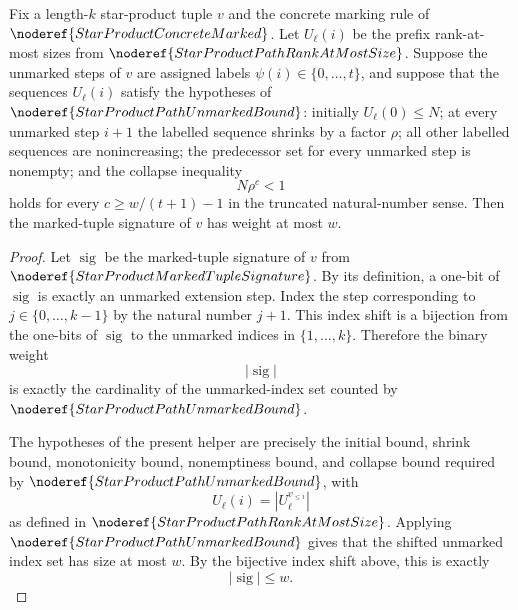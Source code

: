 \begin{helper}
Fix a length-\(k\) star-product tuple \(v\) and the concrete marking rule
of \(\noderef{StarProductConcreteMarked}\).  Let \(U_\ell(i)\) be the
prefix rank-at-most sizes from \(\noderef{StarProductPathRankAtMostSize}\).
Suppose the unmarked steps of \(v\) are assigned labels
\(\psi(i)\in\{0,\ldots,t\}\), and suppose that the sequences
\(U_\ell(i)\) satisfy the hypotheses of \(\noderef{StarProductPathUnmarkedBound}\):
initially \(U_\ell(0)\le N\); at every unmarked step \(i+1\) the labelled
sequence shrinks by a factor \(\rho\); all other labelled sequences are
nonincreasing; the predecessor set for every unmarked step is nonempty; and
the collapse inequality
\[
  N\rho^c<1
\]
holds for every \(c\ge w/(t+1)-1\) in the truncated natural-number sense.
Then the marked-tuple signature of \(v\) has weight at most \(w\).
\end{helper}
\begin{proof}
Let \(\operatorname{sig}\) be the marked-tuple signature of \(v\) from
\(\noderef{StarProductMarkedTupleSignature}\).  By its definition, a
one-bit of \(\operatorname{sig}\) is exactly an unmarked extension step.
Index the step corresponding to \(j\in\{0,\ldots,k-1\}\) by the natural
number \(j+1\).  This index shift is a bijection from the one-bits of
\(\operatorname{sig}\) to the unmarked indices in \(\{1,\ldots,k\}\).
Therefore the binary weight
\[
  |\operatorname{sig}|
\]
is exactly the cardinality of the unmarked-index set counted by
\(\noderef{StarProductPathUnmarkedBound}\).

The hypotheses of the present helper are precisely the initial bound,
shrink bound, monotonicity bound, nonemptiness bound, and collapse bound
required by \(\noderef{StarProductPathUnmarkedBound}\), with
\[
  U_\ell(i)=|U_\ell^{v_{\le i}}|
\]
as defined in \(\noderef{StarProductPathRankAtMostSize}\).  Applying
\(\noderef{StarProductPathUnmarkedBound}\) gives that the shifted unmarked
index set has size at most \(w\).  By the bijective index shift above, this
is exactly
\[
  |\operatorname{sig}|\le w.
\]
\end{proof}
